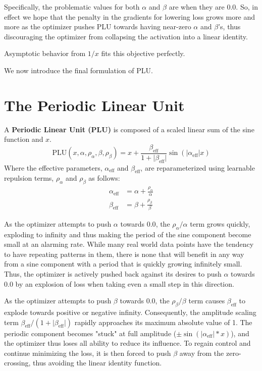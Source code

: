 \documentclass[11pt, letterpaper]{article}
\begin{document}
Specifically, the problematic values for both $\alpha$ and $\beta$ are when they are $0.0$. So, in effect we hope that the penalty in the gradients for lowering loss grows more and more as the optimizer pushes PLU towards having near-zero $\alpha$ and $\beta$'s, thus discouraging the optimizer from collapsing the activation into a linear identity.

Asymptotic behavior from $1 / x$ fits this objective perfectly.

We now introduce the final formulation of PLU.

\section{The Periodic Linear Unit}

A \textbf{Periodic Linear Unit (PLU)} is composed of a scaled linear sum of the sine function and $x$.
\begin{equation}
    \text{PLU}(x, \alpha, \rho_\alpha, \beta, \rho_\beta) = x + \frac{\beta_{\text{eff}}}{1 + \lvert\beta_{\text{eff}}\rvert} \sin(\lvert\alpha_{\text{eff}}\rvert x)
    \label{eq:plu_final}
\end{equation}
Where the effective parameters, $\alpha_{\text{eff}}$ and $\beta_{\text{eff}}$, are reparameterized using learnable repulsion terms, $\rho_\alpha$ and $\rho_\beta$ as follows:
\begin{align}
    \alpha_{\text{eff}} &= \alpha + \frac{\rho_\alpha}{\alpha} \\
    \beta_{\text{eff}} &= \beta + \frac{\rho_\beta}{\beta}
\end{align}

As the optimizer attempts to push $\alpha$ towards $0.0$, the $\rho_\alpha / \alpha$ term grows quickly, exploding to infinity and thus making the period of the sine component become small at an alarming rate. While many real world data points have the tendency to have repeating patterns in them, there is none that will benefit in any way from a sine component with a period that is quickly growing infinitely small. Thus, the optimizer is actively pushed back against its desires to push $\alpha$ towards $0.0$ by an explosion of loss when taking even a small step in this direction.

As the optimizer attempts to push $\beta$ towards $0.0$, the $\rho_\beta / \beta$ term causes $\beta_{\text{eff}}$ to explode towards positive or negative infinity. Consequently, the amplitude scaling term $\beta_{\text{eff}} / (1 + \lvert\beta_{\text{eff}}\rvert)$ rapidly approaches its maximum absolute value of 1. The periodic component becomes "stuck" at full amplitude ($\pm\sin(\lvert\alpha_{\text{eff}}\rvert*x)$), and the optimizer thus loses all ability to reduce its influence. To regain control and continue minimizing the loss, it is then forced to push $\beta$ away from the zero-crossing, thus avoiding the linear identity function.
\end{document}
